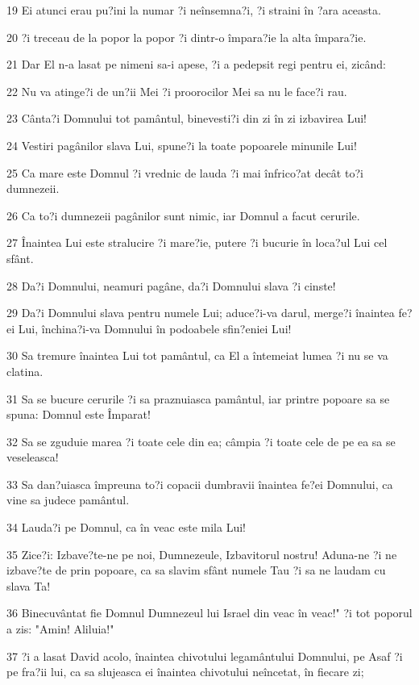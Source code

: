 \par 19 Ei atunci erau pu?ini la numar ?i neînsemna?i, ?i straini în ?ara aceasta.
\par 20 ?i treceau de la popor la popor ?i dintr-o împara?ie la alta împara?ie.
\par 21 Dar El n-a lasat pe nimeni sa-i apese, ?i a pedepsit regi pentru ei, zicând:
\par 22 Nu va atinge?i de un?ii Mei ?i proorocilor Mei sa nu le face?i rau.
\par 23 Cânta?i Domnului tot pamântul, binevesti?i din zi în zi izbavirea Lui!
\par 24 Vestiri pagânilor slava Lui, spune?i la toate popoarele minunile Lui!
\par 25 Ca mare este Domnul ?i vrednic de lauda ?i mai înfrico?at decât to?i dumnezeii.
\par 26 Ca to?i dumnezeii pagânilor sunt nimic, iar Domnul a facut cerurile.
\par 27 Înaintea Lui este stralucire ?i mare?ie, putere ?i bucurie în loca?ul Lui cel sfânt.
\par 28 Da?i Domnului, neamuri pagâne, da?i Domnului slava ?i cinste!
\par 29 Da?i Domnului slava pentru numele Lui; aduce?i-va darul, merge?i înaintea fe?ei Lui, închina?i-va Domnului în podoabele sfin?eniei Lui!
\par 30 Sa tremure înaintea Lui tot pamântul, ca El a întemeiat lumea ?i nu se va clatina.
\par 31 Sa se bucure cerurile ?i sa praznuiasca pamântul, iar printre popoare sa se spuna: Domnul este Împarat!
\par 32 Sa se zguduie marea ?i toate cele din ea; câmpia ?i toate cele de pe ea sa se veseleasca!
\par 33 Sa dan?uiasca împreuna to?i copacii dumbravii înaintea fe?ei Domnului, ca vine sa judece pamântul.
\par 34 Lauda?i pe Domnul, ca în veac este mila Lui!
\par 35 Zice?i: Izbave?te-ne pe noi, Dumnezeule, Izbavitorul nostru! Aduna-ne ?i ne izbave?te de prin popoare, ca sa slavim sfânt numele Tau ?i sa ne laudam cu slava Ta!
\par 36 Binecuvântat fie Domnul Dumnezeul lui Israel din veac în veac!" ?i tot poporul a zis: "Amin! Aliluia!"
\par 37 ?i a lasat David acolo, înaintea chivotului legamântului Domnului, pe Asaf ?i pe fra?ii lui, ca sa slujeasca ei înaintea chivotului neîncetat, în fiecare zi;
